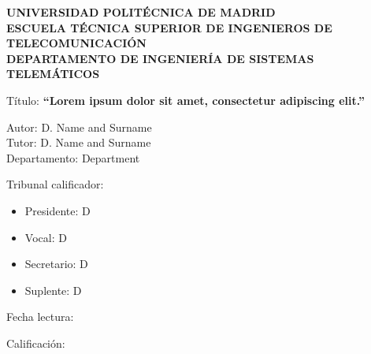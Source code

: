 \begin{center}
\textbf{UNIVERSIDAD POLIT\'{E}CNICA DE MADRID\\
ESCUELA T\'{E}CNICA SUPERIOR DE INGENIEROS DE TELECOMUNICACI\'{O}N\\
DEPARTAMENTO DE INGENIER\'{I}A DE SISTEMAS TELEM\'{A}TICOS\\}

\vspace{1cm}

T\'{i}tulo: \textbf{``Lorem ipsum dolor sit amet, consectetur adipiscing elit.''}
\end{center}
\vspace{1cm}

\noindent Autor: D. Name and Surname\\
Tutor: D. Name and Surname\\
Departamento: Department\\

\vspace{2cm}

\noindent Tribunal calificador:
\begin{itemize}
\item Presidente: D
\item Vocal: D
\item Secretario: D
\item Suplente: D
\end{itemize}
\vspace{2cm}
\noindent Fecha lectura: \\

\vspace*{2cm}

\noindent Calificaci\'{o}n:
\thispagestyle{empty}
\pagebreak
\newpage
\thispagestyle{empty}
\mbox{}
\pagebreak

